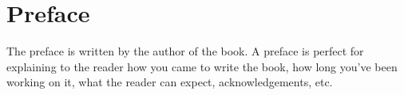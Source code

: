 \documentclass[../workbook]{subfiles}
\begin{document}
%
%

\section*{Preface}

\parbox{\textwidth}{

    \raggedright
    \setlength{\parskip}{1.25em}

    \par{
        The preface is written by the author of the book.
        A preface is perfect for explaining to the reader how you came to write the book,
        how long you’ve been working on it, what the reader can expect, acknowledgements, etc.
    }
}
\end{document}
